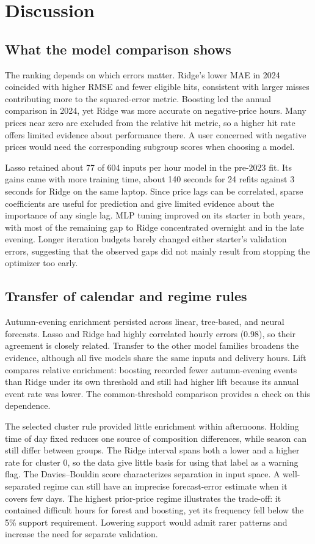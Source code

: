 \section{Discussion}
\subsection{What the model comparison shows}
The ranking depends on which errors matter. Ridge's lower MAE in
2024 coincided with higher RMSE and fewer eligible hits, consistent
with larger misses contributing more to the squared-error metric.
Boosting led the annual comparison in 2024, yet Ridge was more
accurate on negative-price hours. Many prices near zero are excluded
from the relative hit metric, so a higher hit rate offers limited
evidence about performance there. A user concerned with negative prices
would need the corresponding subgroup scores when choosing a model.

Lasso retained about 77 of 604 inputs per hour model in the pre-2023
fit. Its gains came with more training time, about 140 seconds for
24 refits against 3 seconds for Ridge on the same laptop. Since
price lags can be correlated, sparse coefficients are useful for
prediction and give limited evidence about the importance of any
single lag. MLP tuning improved on its starter in both years, with
most of the remaining gap to Ridge concentrated overnight and in the
late evening. Longer iteration budgets barely changed either
starter's validation errors, suggesting that the observed gaps
did not mainly result from stopping the optimizer too early.

\subsection{Transfer of calendar and regime rules}
Autumn-evening enrichment persisted across linear, tree-based, and
neural forecasts. Lasso and Ridge had highly correlated hourly
errors (0.98), so their agreement is closely related. Transfer to
the other model families broadens the evidence, although all five
models share the same inputs and delivery hours. Lift compares
relative enrichment: boosting recorded fewer autumn-evening
events than Ridge under its own threshold and still had higher lift
because its annual event rate was lower. The common-threshold
comparison provides a check on this dependence.

The selected cluster rule provided little enrichment within
afternoons. Holding time of day fixed reduces one source of
composition differences, while season can still differ between
groups. The Ridge interval spans both a lower and a higher rate
for cluster 0, so the data give little basis for using that label
as a warning flag. The Davies--Bouldin score characterizes
separation in input space. A well-separated regime can still have
an imprecise forecast-error estimate when it covers few days.
The highest prior-price regime illustrates the trade-off: it
contained difficult hours for forest and boosting, yet its
frequency fell below the 5\% support requirement. Lowering support
would admit rarer patterns and increase the need for separate
validation.

